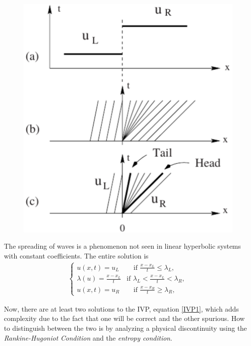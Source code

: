\documentclass[]{article}
\begin{document}
			\begin{figure}[h] 	
				\centering
				\includegraphics[scale=.55]{RarefactionWave}
				\caption{}
				\label{RarefactionWave}
			\end{figure}
			The spreading of waves is a phenomenon not seen in linear hyperbolic systems with constant coefficients. The entire solution is
			\begin{equation}
				\begin{aligned}
				\left\{
					\begin{array}{ll}
						u(x,t) = u_L & \quad \mbox{if } \frac{x - x_L}{t} \leq \lambda_L, \\
						\lambda(u) = \frac{x - x_L}{t} & \mbox{if } \lambda_L < \frac{x - x_L}{t} < \lambda_R, \\
						u(x,t) = u_R & \quad \mbox{if } \frac{x - x_R}{t} \geq \lambda_R,
					\end{array}
				\right.
				\end{aligned}
			\end{equation}
	
			Now, there are at least two solutions to the IVP, equation \ref{IVP1}, which adds complexity due to the fact that one will be correct and the other spurious. How to distinguish between the two is by analyzing a physical discontinuity using the \textit{Rankine-Hugoniot Condition} and the \textit{entropy condition}.
	
\end{document}
